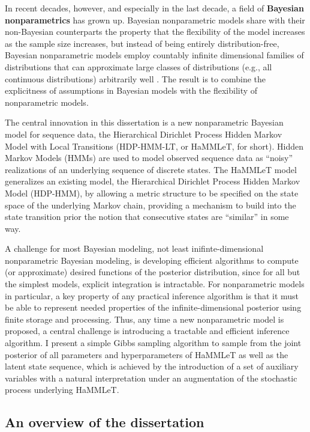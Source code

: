 In recent decades, however, and especially in the last decade, a field
of {\bf Bayesian nonparametrics} has grown up.  Bayesian nonparametric
models share with their non-Bayesian counterparts the property that
the flexibility of the model increases as the sample size increases,
but instead of being entirely distribution-free, Bayesian
nonparametric models employ countably infinite dimensional families of
distributions that can approximate large classes of distributions (e.g., all continuous
distributions) arbitrarily well
\citep{lindsay1995mixture,mclachlan2004finite}.  The result is to
combine the explicitness of assumptions in Bayesian models with the
flexibility of nonparametric models.

The central innovation in this dissertation is a new nonparametric
Bayesian model for sequence data, the Hierarchical Dirichlet
Process Hidden Markov Model with Local Transitions (HDP-HMM-LT, or
HaMMLeT, for short).  Hidden Markov Models (HMMs) are used to model
observed sequence data as ``noisy'' realizations of an underlying
sequence of discrete states.  The HaMMLeT model generalizes an existing model, the
Hierarchical Dirichlet Process Hidden Markov Model (HDP-HMM), by
allowing a metric structure to be specified on the state space of the
underlying Markov chain, providing a mechanism to build into the state
transition prior the notion that consecutive states are ``similar'' in
some way.

A challenge for most Bayesian modeling, not least inifinte-dimensional nonparametric
Bayesian modeling, is developing efficient algorithms to compute
(or approximate) desired functions of the posterior distribution,
since for all but the simplest models, explicit integration is
intractable.  For nonparametric models in particular, a key property of any
practical inference algorithm is that it must be able to represent
needed properties of the infinite-dimensional posterior using finite
storage and processing.  Thus, any time a new nonparametric model is
proposed, a central challenge is introducing a tractable and efficient
inference algorithm.  I present a simple Gibbs sampling algorithm
\cite{geman1984stochastic} to sample from the joint posterior of all
parameters and hyperparameters of HaMMLeT as well as the latent state
sequence, which is achieved by the introduction of a set of auxiliary
variables with a natural interpretation under an augmentation of the
stochastic process underlying HaMMLeT.

\subsection{An overview of the dissertation}
\label{sec:an-overv-diss}

